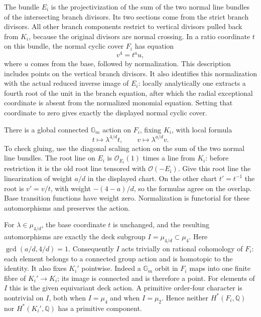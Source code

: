 \documentclass[11pt]{article}
\newcommand{\Q}{\mathbb Q}\newcommand{\C}{\mathbb C}\newcommand{\Z}{\mathbb Z}\newcommand{\R}{\mathbb R}\newcommand{\A}{\mathbb A}\newcommand{\OO}{\mathcal O}
\theoremstyle{definition}\newtheorem{definition}[theorem]{Definition}\newtheorem{remark}[theorem]{Remark}
\begin{document}
The bundle $E_i$ is the projectivization of the
sum of the two normal line bundles of the
intersecting branch divisors.  Its two sections
come from the strict branch divisors.  All other
branch components restrict to vertical divisors
pulled back from $K_i$, because the original
divisors are normal crossing.  In a ratio
coordinate $t$ on this bundle, the normal cyclic
cover $F_i$ has equation
\[
                       v^4=t^a u,
                                                        \tag{C32l}
\]
where $u$ comes from the base, followed by
normalization.  This description includes points
on the vertical branch divisors.  It also identifies
this normalization with the actual reduced inverse
image of $E_i$: locally analytically one extracts
a fourth root of the unit in the branch equation,
after which the radial exceptional coordinate is
absent from the normalized monomial equation.
Setting that coordinate to zero gives exactly
the displayed normal cyclic cover.

There is a global connected $\mathbb G_m$ action
on $F_i$, fixing $K_i$, with local formula
\[
              t\longmapsto\lambda^{4/d}t,
              \qquad v\longmapsto\lambda^{a/d}v.
                                                        \tag{C32m}
\]
To check gluing, use the diagonal scaling action
on the sum of the two normal line bundles.
The root line on $E_i$ is $\mathcal O_{E_i}(1)$
times a line from $K_i$: before restriction it
is the old root line tensored with
$\mathcal O(-E_i)$.  Give this root line the
linearization of weight $a/d$ in the displayed
chart.  On the other chart $t'=t^{-1}$ the
root is $v'=v/t$, with weight $-(4-a)/d$,
so the formulas agree on the overlap.  Base
transition functions have weight zero.
Normalization is functorial for these
automorphisms and preserves the action.

For $\lambda\in\mu_{4/d}$, the base coordinate
$t$ is unchanged, and the resulting automorphisms
are exactly the deck subgroup
$I=\mu_{4/d}\subset\mu_4$.  Here
$\gcd(a/d,4/d)=1$.  Consequently $I$ acts
trivially on rational cohomology of $F_i$:
each element belongs to a connected group
action and is homotopic to the identity.
It also fixes $K_i'$ pointwise.  Indeed a
$\mathbb G_m$ orbit in $F_i$ maps into one
finite fibre of $K_i'\to K_i$; its image is
connected and is therefore a point.  For
elements of $I$ this is the given equivariant
deck action.  A primitive order-four character
is nontrivial on $I$, both when $I=\mu_4$
and when $I=\mu_2$.  Hence neither
$H^*(F_i,\Q)$ nor $H^*(K_i',\Q)$ has a
primitive component.
\end{document}
